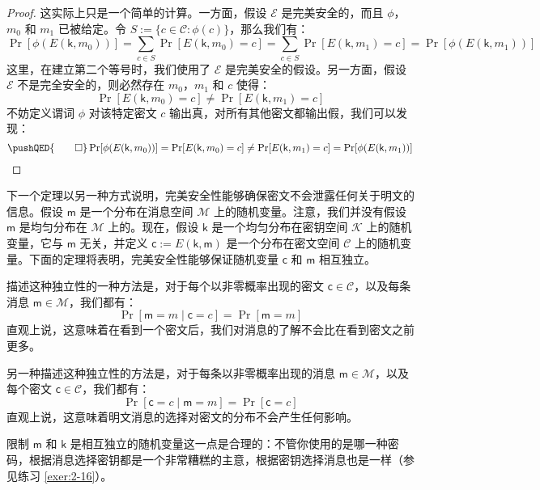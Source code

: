 \begin{proof}
这实际上只是一个简单的计算。一方面，假设 $\mathcal{E}$ 是完美安全的，而且 $\phi$，$m_0$ 和 $m_1$ 已被给定。令 $S:=\{c\in\mathcal{C}:\phi(c)\}$，那么我们有：
\[
\Pr[\phi(E(\mathsf{k}, m_0))]=\sum_{c\in S}\Pr[E(\mathsf{k}, m_0) = c]=\sum_{c\in S}\Pr[E(\mathsf{k}, m_1) = c]=\Pr[\phi(E(\mathsf{k}, m_1) )]
\]
这里，在建立第二个等号时，我们使用了 $\mathcal{E}$ 是完美安全的假设。另一方面，假设 $\mathcal{E}$ 不是完全安全的，则必然存在 $m_0$，$m_1$ 和 $c$ 使得：
\[
\Pr[E(\mathsf{k},m_0)=c]\neq
\Pr[E(\mathsf{k},m_1)=c]
\]
不妨定义谓词 $\phi$ 对该特定密文 $c$ 输出真，对所有其他密文都输出假，我们可以发现：
\[
\pushQED{\qed}
\Pr[\phi(E(\mathsf{k}, m_0))]= 
\Pr[E(\mathsf{k}, m_0) = c]\neq
\Pr[E(\mathsf{k}, m_1) = c]=
\Pr[\phi(E(\mathsf{k}, m_1))]\qedhere
\]
\end{proof}

下一个定理以另一种方式说明，完美安全性能够确保密文不会泄露任何关于明文的信息。假设 $\mathsf{m}$ 是一个分布在消息空间 $\mathcal{M}$ 上的随机变量。注意，我们并没有假设 $\mathsf{m}$ 是均匀分布在 $\mathcal{M}$ 上的。现在，假设 $\mathsf{k}$ 是一个均匀分布在密钥空间 $\mathcal{K}$ 上的随机变量，它与 $\mathsf{m}$ 无关，并定义 $\mathsf{c}:=E(\mathsf{k},\mathsf{m})$ 是一个分布在密文空间 $\mathcal{C}$ 上的随机变量。下面的定理将表明，完美安全性能够保证随机变量 $\mathsf{c}$ 和 $\mathsf{m}$ 相互独立。

描述这种独立性的一种方法是，对于每个以非零概率出现的密文 $\mathsf{c}\in\mathcal{C}$，以及每条消息 $\mathsf{m}\in\mathcal{M}$，我们都有：
\[
\Pr[\mathsf{m}=m\;|\;\mathsf{c}=c]=
\Pr[\mathsf{m}=m]
\]
直观上说，这意味着在看到一个密文后，我们对消息的了解不会比在看到密文之前更多。

另一种描述这种独立性的方法是，对于每条以非零概率出现的消息 $\mathsf{m}\in\mathcal{M}$，以及每个密文 $\mathsf{c}\in\mathcal{C}$，我们都有：
\[
\Pr[\mathsf{c}=c\;|\;\mathsf{m}=m]=
\Pr[\mathsf{c}=c]
\]
直观上说，这意味着明文消息的选择对密文的分布不会产生任何影响。

限制 $\mathsf{m}$ 和 $\mathsf{k}$ 是相互独立的随机变量这一点是合理的：不管你使用的是哪一种密码，根据消息选择密钥都是一个非常糟糕的主意，根据密钥选择消息也是一样（参见练习 \ref{exer:2-16}）。

